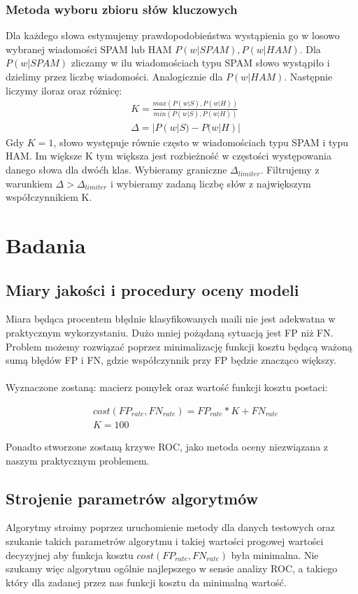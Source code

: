 \documentclass[fleqn]{article}
\begin{document}
\subsubsection{Metoda wyboru zbioru słów kluczowych}
Dla każdego słowa estymujemy prawdopodobieństwa wystąpienia go w losowo wybranej wiadomości SPAM lub HAM $P(w|SPAM), P(w|HAM)$. Dla $P(w|SPAM)$ zliczamy w ilu wiadomościach typu SPAM słowo wystąpiło i dzielimy przez liczbę wiadomości. Analogicznie dla $P(w|HAM)$. Następnie liczymy iloraz oraz różnicę:
\begin{align*}
    &K = \frac {max(  P(w|S), P(w|H)  )}{min(  P(w|S), P(w|H)  )} \\
    &\Delta = | P(w|S) - P(w|H) |
\end{align*}
Gdy $K=1$, słowo występuje równie często w wiadomościach typu SPAM i typu HAM. Im większe K tym większa jest rozbieżność w częstości występowania danego słowa dla dwóćh klas.
Wybieramy graniczne $\Delta_{limiter}$. Filtrujemy z warunkiem $\Delta > \Delta_{limiter}$ i wybieramy zadaną liczbę słów z największym współczynnikiem K.



\section{Badania}
\subsection {Miary jakości i procedury oceny modeli}
Miara będąca procentem błędnie klasyfikowanych maili nie jest adekwatna w praktycznym wykorzystaniu. Dużo mniej pożądaną sytuacją jest FP niż FN. Problem możemy rozwiązać poprzez minimalizację funkcji kosztu będącą ważoną sumą błędów FP i FN, gdzie współczynnik przy FP będzie znacząco większy.
\\ \\
Wyznaczone zostaną: macierz pomyłek oraz wartość funkcji kosztu postaci:

\begin{align*}
  &cost(FP_{rate}, FN_{rate}) = FP_{rate} * K + FN_{rate} \\
  &K = 100
\end{align*}

Ponadto stworzone zostaną krzywe ROC, jako metoda oceny niezwiązana z naszym praktycznym problemem.

\subsection {Strojenie parametrów algorytmów}
Algorytmy stroimy poprzez uruchomienie metody dla danych testowych oraz szukanie takich parametrów algorytmu i takiej wartości progowej wartości decyzyjnej aby funkcja kosztu $cost(FP_{rate}, FN_{rate})$ była minimalna. Nie szukamy więc algorytmu ogólnie najlepszego w sensie analizy ROC, a takiego który dla zadanej przez nas funkcji kosztu da minimalną wartość. 
\end{document}
